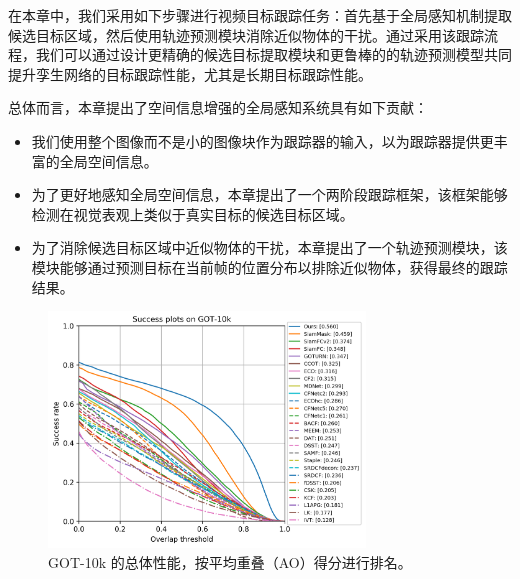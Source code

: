 在本章中，我们采用如下步骤进行视频目标跟踪任务：首先基于全局感知机制提取候选目标区域，然后使用轨迹预测模块消除近似物体的干扰。通过采用该跟踪流程，我们可以通过设计更精确的候选目标提取模块和更鲁棒的的轨迹预测模型共同提升孪生网络的目标跟踪性能，尤其是长期目标跟踪性能。

总体而言，本章提出了空间信息增强的全局感知系统具有如下贡献：
\begin{itemize}
\item 我们使用整个图像而不是小的图像块作为跟踪器的输入，以为跟踪器提供更丰富的全局空间信息。
\item 为了更好地感知全局空间信息，本章提出了一个两阶段跟踪框架，该框架能够检测在视觉表观上类似于真实目标的候选目标区域。
\item 为了消除候选目标区域中近似物体的干扰，本章提出了一个轨迹预测模块，该模块能够通过预测目标在当前帧的位置分布以排除近似物体，获得最终的跟踪结果。
\end{itemize}

\begin{figure}[t]
\centering
    \includegraphics[width=0.75\textwidth]{Img/globally/success_plot.png}
    \caption{GOT-10k 的总体性能，按平均重叠（AO）得分进行排名。}
\end{figure}

